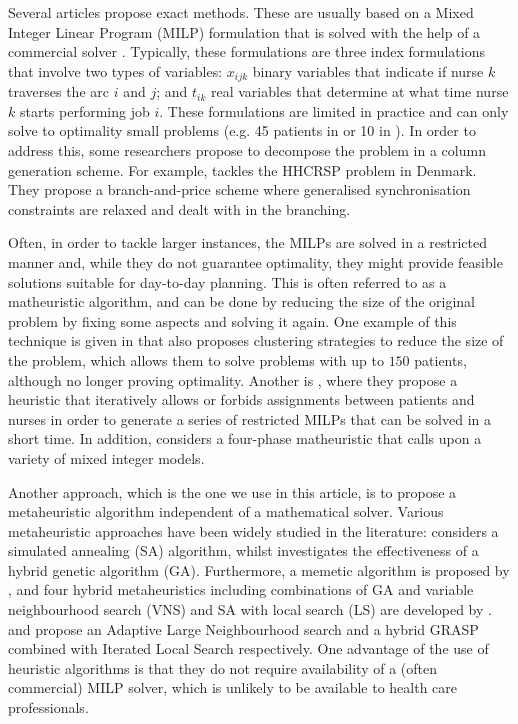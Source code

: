 \documentclass[a4paper,11pt,authoryear]{elsarticle}
\begin{document}
Several articles propose exact methods. These are usually based on a Mixed Integer Linear Program (MILP) formulation that is solved with the help of a commercial solver \citep{bredstrom2008,bachouch2011, mankowska2014, aithaddadene2016}. Typically, these formulations are three index formulations that involve two types of variables: $x_{ijk}$ binary variables that indicate if nurse $k$ traverses the arc $i$ and $j$; and $t_{ik}$ real variables that determine at what time nurse $k$ starts performing job $i$. These formulations are limited in practice and can only solve to optimality small problems (e.g. 45 patients in \cite{aithaddadene2016} or 10 in \cite{mankowska2014}). In order to address this, some researchers propose to decompose the problem in a column generation scheme. For example, \cite{rasmussen2012} tackles the HHCRSP problem in Denmark. They propose a branch-and-price scheme where generalised synchronisation constraints are relaxed and dealt with in the branching.%

Often, in order to tackle larger instances, the MILPs are solved in a restricted manner and, while they do not guarantee optimality, they might provide feasible solutions suitable for day-to-day planning. This is often referred to as a matheuristic algorithm, and can be done by reducing the size of the original problem by fixing some aspects and solving it again. One example of this technique is given in \cite{rasmussen2012} that also proposes clustering strategies to reduce the size of the problem, which allows them to solve problems with up to $150$ patients, although no longer proving optimality. Another is \cite{bredstrom2008}, where they propose a heuristic that iteratively allows or forbids assignments between patients and nurses in order to generate a series of restricted MILPs that can be solved in a short time. In addition, \citet{nikzad2021} considers a four-phase matheuristic that calls upon a variety of mixed integer models.

Another approach, which is the one we use in this article, is to propose a metaheuristic algorithm independent of a mathematical solver. Various metaheuristic approaches have been widely studied in the literature: \citet{manavizadeh2020} considers a simulated annealing (SA) algorithm, whilst \citet{nasir2020} investigates the effectiveness of a hybrid genetic algorithm (GA). Furthermore, a memetic algorithm is proposed by \citet{shahnejat2021}, and four hybrid metaheuristics including combinations of GA and variable neighbourhood search (VNS) and SA with local search (LS) are developed by \citet{liu2021}. \cite{mankowska2014} and \cite{aithaddadene2016} propose an Adaptive Large Neighbourhood search and a hybrid GRASP combined with Iterated Local Search respectively. One advantage of the use of heuristic algorithms is that they do not require availability of a (often commercial) MILP solver, which is unlikely to be available to health care professionals. 
\end{document}
